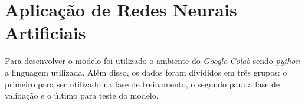 

\section{Aplicação de Redes Neurais Artificiais}
    Para desenvolver o modelo foi utilizado o ambiente do \emph{Google Colab} sendo \emph{python} a linguagem
    utilizada. Além disso, os dados foram divididos em três grupos: o primeiro para ser utilizado na fase de 
    treinamento, o segundo para a fase de validação e o último para teste do modelo.
    